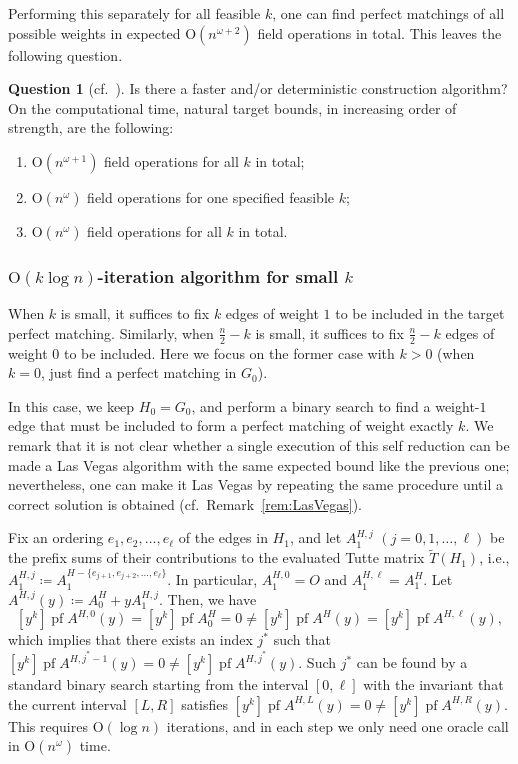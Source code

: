\documentclass[11pt, a4paper]{article}
\theoremstyle{plain}
\theoremstyle{definition}
\newtheorem{question}[theorem]{Question}
\theoremstyle{remark}
\DeclareMathOperator{\pf}{pf}
\begin{document}
Performing this separately for all feasible $k$, one can find perfect matchings of all possible weights in expected $\mathrm{O}(n^{\omega+2})$ field operations in total.
This leaves the following question.

\begin{question}[cf.~\cite{Yamaguchi2025}]\label{qu:reconstruction}
Is there a faster and/or deterministic construction algorithm?
On the computational time, natural target bounds, in increasing order of strength, are the following:
\begin{enumerate}
\setlength{\itemsep}{0.5mm}
\item $\mathrm{O}(n^{\omega+1})$ field operations for all $k$ in total;
\item $\mathrm{O}(n^\omega)$ field operations for one specified feasible $k$;
\item $\mathrm{O}(n^\omega)$ field operations for all $k$ in total.
\end{enumerate}
\end{question}



\subsubsection{$\mathrm{O}(k \log n)$-iteration algorithm for small $k$}\label{sec:self-reduction_small}
When $k$ is small, it suffices to fix $k$ edges of weight $1$ to be included in the target perfect matching.
Similarly, when $\frac{n}{2} - k$ is small, it suffices to fix $\frac{n}{2} - k$ edges of weight $0$ to be included.
Here we focus on the former case with $k > 0$ (when $k = 0$, just find a perfect matching in $G_0$).

In this case, we keep $H_0 = G_0$, and perform a binary search to find a weight-$1$ edge that must be included to form a perfect matching of weight exactly $k$.
We remark that it is not clear whether a single execution of this self reduction can be made a Las Vegas algorithm with the same expected bound like the previous one; nevertheless, one can make it Las Vegas by repeating the same procedure until a correct solution is obtained (cf.~Remark~\ref{rem:LasVegas}).

Fix an ordering $e_1, e_2, \dots, e_\ell$ of the edges in $H_1$, and let $A_{1}^{H, j}$ $(j = 0, 1, \dots, \ell)$ be the prefix sums of their contributions to the evaluated Tutte matrix $\tilde{T}(H_1)$, i.e., $A_{1}^{H, j} \coloneqq A_1^{H - \{e_{j+1}, e_{j+2}, \dots, e_\ell\}}$.
In particular, $A_{1}^{H,0} = O$ and $A_{1}^{H,\ell} = A_1^H$.
Let $A^{H,j}(y) \coloneqq A_0^H + yA_{1}^{H,j}$.
Then, we have
\[[y^k]\pf A^{H,0}(y) = [y^k]\pf A_0^H = 0 \neq [y^k]\pf A^H(y) = [y^k]\pf A^{H,\ell}(y),\]
which implies that there exists an index $j^*$ such that $[y^k]\pf A^{H, j^*-1}(y) = 0 \neq [y^k]\pf A^{H,j^*}(y)$.
Such $j^*$ can be found by a standard binary search starting from the interval $[0, \ell]$ with the invariant that the current interval $[L, R]$ satisfies $[y^k]\pf A^{H, L}(y) = 0 \neq [y^k]\pf A^{H,R}(y)$.
This requires $\mathrm{O}(\log n)$ iterations, and in each step we only need one oracle call in $\mathrm{O}(n^\omega)$ time.
\end{document}
